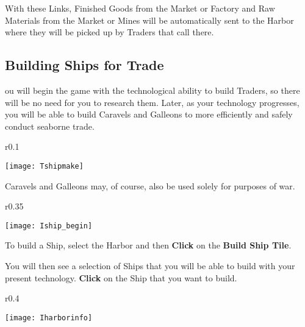 With these Links, Finished Goods from the Market or Factory and Raw Materials from the Market or Mines will be automatically sent to the Harbor where they will be picked up by Traders that call there.

\subsection{\textsf{Building Ships for Trade}}


ou will begin the game with the technological ability to build Traders, so there will be no need for you to research them. Later, as your technology progresses, you will be able to build Caravels and Galleons to more efficiently and safely conduct seaborne trade.

\begin{wrapfigure}{r}{0.1\textwidth}
    \vspace{-20pt}
    \begin{center}
        \texttt{[image: Tshipmake]}
    \end{center}
    \vspace{-20pt}
\end{wrapfigure}

Caravels and Galleons may, of course, also be used solely for purposes of war.

\begin{wrapfigure}{r}{0.35\textwidth}
	\vspace{-20pt}
	\begin{center}
		\texttt{[image: Iship\_begin]} %
	\end{center}
	\vspace{-20pt}
\end{wrapfigure}

To build a Ship, select the Harbor and then \textbf{Click} on the \textbf{Build Ship Tile}.

You will then see a selection of Ships that you will be able to build with your present technology. \textbf{Click} on the Ship that you want to build.

\begin{wrapfigure}{r}{0.4\textwidth}
	\vspace{-20pt}
	\begin{center}
		\texttt{[image: Iharborinfo]} %
	\end{center}
	\vspace{-20pt}
\end{wrapfigure}

